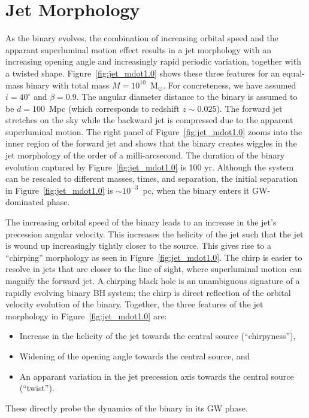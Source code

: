 \documentclass[a4paper,fleqn,usenatbib]{mnras}
\begin{document}
\section{Jet Morphology}

As the binary evolves, the combination of increasing orbital speed and
the apparant superluminal motion effect results in a jet morphology
with an increasing opening angle and increasingly rapid periodic
variation, together with a twisted shape.
Figure~\ref{fig:jet_mdot1.0} shows these three features for an
equal-mass binary with total mass $M=10^{10}$~M$_\odot$.  For
concreteness, we have assumed $i=40^\circ$ and $\beta=0.9$.  The
angular diameter distance to the binary is assumed to be $d = 100$~Mpc
(which corresponds to redshift $z\sim 0.025$).  The forward jet
stretches on the sky while the backward jet is compressed due to the
apparent superluminal motion.  The right panel of
Figure~\ref{fig:jet_mdot1.0} zooms into the inner region of the
forward jet and shows that the binary creates wiggles in the jet
morphology of the order of a milli-arcsecond.  The duration of the
binary evolution captured by Figure~\ref{fig:jet_mdot1.0} is 100 yr.
Although the system can be rescaled to different masses, times, and
separation, the initial separation in Figure~\ref{fig:jet_mdot1.0} is
$\sim 10^{-3}$~pc, when the binary enters it GW-dominated phase.

The increasing orbital speed of the binary leads to an increase in the
jet's precession angular velocity.  This increases the helicity of the
jet such that the jet is wound up increasingly tightly closer to the
source.  This gives rise to a ``chirping'' morphology as seen in
Figure~\ref{fig:jet_mdot1.0}.  The chirp is easier to resolve in jets
that are closer to the line of sight, where superluminal motion can
magnify the forward jet.  A chirping black hole is an unambiguous
signature of a rapidly evolving binary BH system; the chirp is direct
reflection of the orbital velocity evolution of the binary. Together,
the three features of the jet morphology in
Figure~\ref{fig:jet_mdot1.0} are:
\begin{itemize}
\item Increase in the helicity of the jet towards the central source (``chirpyness''),
\item Widening of the opening angle towards the central source, and 
\item An apparant variation in the jet precession axis towards the central source (``twist''). 
\end{itemize}
These directly probe the dynamics of the binary in its GW phase.
\end{document}
